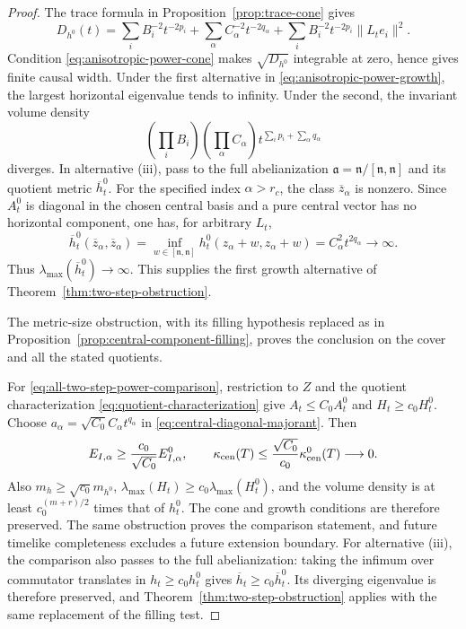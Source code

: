 \documentclass[10pt,a4paper]{article}
\numberwithin{equation}{section}
\theoremstyle{definition}
\theoremstyle{remark}
\begin{document}
\begin{proof}
The trace formula in Proposition~\ref{prop:trace-cone} gives
\[
 D_{h^0}(t)=
 \sum_i B_i^{-2}t^{-2p_i}
 +\sum_\alpha C_\alpha^{-2}t^{-2q_\alpha}
 +\sum_i B_i^{-2}t^{-2p_i}\|L_te_i\|^2.
\]
Condition \eqref{eq:anisotropic-power-cone} makes
$\sqrt{D_{h^0}}$ integrable at zero, hence gives finite causal width.
Under the first alternative in \eqref{eq:anisotropic-power-growth},
the largest horizontal eigenvalue tends to infinity.  Under the second,
the invariant volume density
\[
 \left(\prod_i B_i\right)\left(\prod_\alpha C_\alpha\right)
 t^{\sum_i p_i+\sum_\alpha q_\alpha}
\]
diverges.  In alternative \textup{(iii)}, pass to the full abelianization
$\mathfrak a=\mathfrak n/[\mathfrak n,\mathfrak n]$ and its quotient
metric $\overline h_t^0$.  For the specified index $\alpha>r_c$, the
class $\overline z_\alpha$ is nonzero.  Since $A_t^0$ is diagonal in
the chosen central basis and a pure central vector has no horizontal
component, one has, for arbitrary $L_t$,
\[
 \overline h_t^0(\overline z_\alpha,\overline z_\alpha)
 =\inf_{w\in[\mathfrak n,\mathfrak n]}
       h_t^0(z_\alpha+w,z_\alpha+w)
 =C_\alpha^2t^{2q_\alpha}\longrightarrow\infty.
\]
Thus $\lambda_{\max}(\overline h_t^0)\to\infty$.
This supplies the first growth alternative of
Theorem~\ref{thm:two-step-obstruction}.

The metric-size obstruction, with its filling hypothesis
replaced as in Proposition~\ref{prop:central-component-filling}, proves
the conclusion on the cover and all the stated quotients.

For \eqref{eq:all-two-step-power-comparison}, restriction to $Z$ and
the quotient characterization \eqref{eq:quotient-characterization}
give $A_t\le C_0A_t^0$ and $H_t\ge c_0H_t^0$.
Choose $a_\alpha=\sqrt{C_0}C_\alpha t^{q_\alpha}$ in
\eqref{eq:central-diagonal-majorant}.  Then
\[
 E_{I,\alpha}\ge\frac{c_0}{\sqrt{C_0}}E_{I,\alpha}^0,
 \qquad
 \kappa_{\rm cen}(T)
 \le\frac{\sqrt{C_0}}{c_0}\kappa_{\rm cen}^0(T)\longrightarrow0.
\]
Also $m_h\ge\sqrt{c_0}m_{h^0}$,
$\lambda_{\max}(H_t)\ge c_0\lambda_{\max}(H_t^0)$, and the
volume density is at least $c_0^{(m+r)/2}$ times that of $h_t^0$.
The cone and growth conditions are therefore preserved.  The same
obstruction proves the comparison statement, and future timelike
completeness excludes a future extension boundary.
For alternative \textup{(iii)}, the comparison also passes to the full
abelianization: taking the infimum over commutator translates in
$h_t\ge c_0h_t^0$ gives
$\overline h_t\ge c_0\overline h_t^0$.
Its diverging eigenvalue is therefore preserved, and
Theorem~\ref{thm:two-step-obstruction} applies with the same replacement
of the filling test.

\end{proof}
\end{document}
